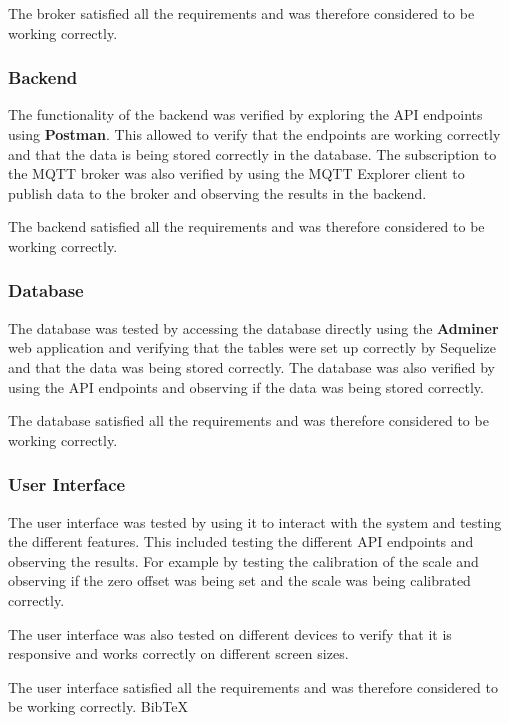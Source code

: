The broker satisfied all the requirements and was therefore considered to be working correctly.

\subsubsection{Backend}
The functionality of the backend was verified by exploring the API endpoints using \textbf{Postman}. This allowed to verify that the endpoints are working correctly and that the data is being stored correctly in the database. The subscription to the MQTT broker was also verified by using the MQTT Explorer client to publish data to the broker and observing the results in the backend.

The backend satisfied all the requirements and was therefore considered to be working correctly.

\subsubsection{Database}
The database was tested by accessing the database directly using the \textbf{Adminer} web application and verifying that the tables were set up correctly by Sequelize and that the data was being stored correctly. The database was also verified by using the API endpoints and observing if the data was being stored correctly.

The database satisfied all the requirements and was therefore considered to be working correctly.

\subsubsection{User Interface}
The user interface was tested by using it to interact with the system and testing the different features. This included testing the different API endpoints and observing the results. For example by testing the calibration of the scale and observing if the zero offset was being set and the scale was being calibrated correctly.

The user interface was also tested on different devices to verify that it is responsive and works correctly on different screen sizes.

The user interface satisfied all the requirements and was therefore considered to be working correctly.
\Gls{BibTeX}